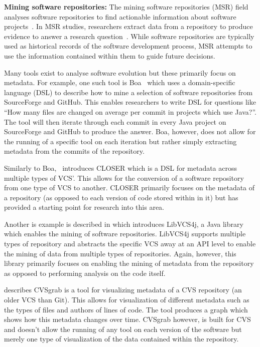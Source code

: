 \textbf{Mining software repositories:} The mining software repositories (MSR) field analyses software repositories to find actionable information about software projects~\cite{msrconf}.
In MSR studies, researchers extract data from a repository to produce evidence to answer a research question~\cite{road_ahead_for_msr}.
While software repositories are typically used as historical records of the software development process, MSR attempts to use the information contained within them to guide future decisions.

Many tools exist to analyse software evolution but these primarily focus on metadata.
For example, one such tool is Boa~\cite{boa} which uses a domain-specific language (DSL) to describe how to mine a selection of software repositories from SourceForge and GitHub.
This enables researchers to write DSL for questions like ``How many files are changed on average per commit in projects which use Java?''.
The tool will then iterate through each commit in every Java project on SourceForge and GitHub to produce the answer.
Boa, however, does not allow for the running of a specific tool on each iteration but rather simply extracting metadata from the commits of the repository.

Similarly to Boa,~\cite{closer} introduces CLOSER which is a DSL for metadata across multiple types of VCS'.
This allows for the conversion of a software repository from one type of VCS to another.
CLOSER primarily focuses on the metadata of a repository (as opposed to each version of code stored within in it) but has provided a starting point for research into this area.

Another is example is described in \cite{libvcs4j} which introduces LibVCS4j, a Java library which enables the mining of software repositories.
LibVCS4j supports multiple types of repository and abstracts the specific VCS away at an API level to enable the mining of data from multiple types of repositories.
Again, however, this library primarily focuses on enabling the mining of metadata from the repository as opposed to performing analysis on the code itself.

\cite{cvsgrab} describes CVSgrab is a tool for visualizing metadata of a CVS repository (an older VCS than Git).
This allows for visualization of different metadata such as the types of files and authors of lines of code.
The tool produces a graph which shows how this metadata changes over time.
CVSgrab however, is built for CVS and doesn't allow the running of any tool on each version of the software but merely one type of visualization of the data contained within the repository.

